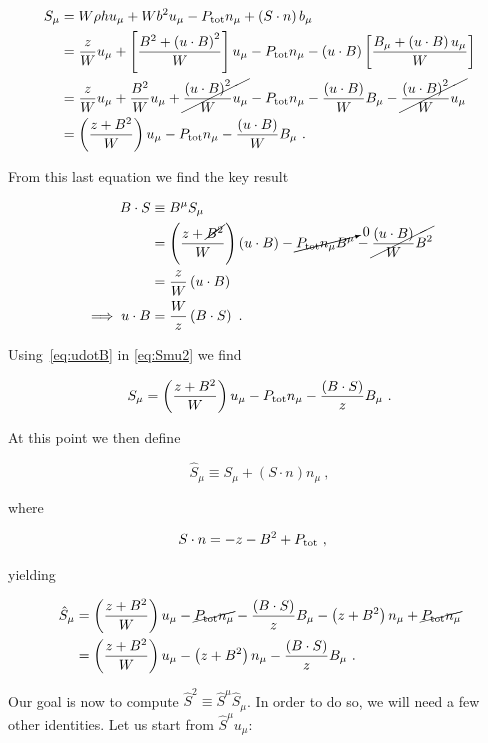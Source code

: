 \documentclass{article}
\newcommand{\BdotS}{B\cdot S}
\newcommand{\Sdotn}{S\cdot n}
\newcommand{\udotB}{u\cdot B}
\newcommand{\Ptot}{P_{\rm tot}}
\newcommand{\eq}[1]{
\begin{equation}
    #1
\end{equation}
}
\newcommand{\spl}[1]{
\eq{
\begin{split}
    #1
\end{split}
}
}
\begin{document}
\spl{
S_{\mu} &= W\rho h u_{\mu} + W b^{2} u_{\mu} - \Ptot n_{\mu} + \left(\Sdotn\right)b_{\mu}\\
&= \frac{z}{W}u_{\mu} + \left[\frac{B^{2}+\left(\udotB\right)^{2}}{W}\right]u_{\mu} - \Ptot n_{\mu} - \left(\udotB\right)\left[\frac{B_{\mu} + \left(\udotB\right)u_{\mu}}{W}\right]\\
&= \frac{z}{W}u_{\mu} + \frac{B^{2}}{W}u_{\mu} + \cancel{\frac{\left(\udotB\right)^{2}}{W}u_{\mu}} - \Ptot n_{\mu} - \frac{\left(\udotB\right)}{W}B_{\mu} -\cancel{\frac{\left(\udotB\right)^{2}}{W}u_{\mu}}\\
& = \left(\frac{z+B^{2}}{W}\right)u_{\mu} - \Ptot n_{\mu} - \frac{\left(\udotB\right)}{W}B_{\mu}\ .\label{eq:Smu2}
}

\noindent From this last equation we find the key result

\spl{
\BdotS &\equiv B^{\mu}S_{\mu}\\
       &= \left(\frac{z + \cancel{B^{2}}}{W}\right)\left(\udotB\right) - \cancelto{0}{\Ptot n_{\mu}B^{\mu}} - \cancel{\frac{\left(\udotB\right)}{W}B^{2}}\\
      &= \frac{z}{W}\left(\udotB\right)\\
\implies \udotB &= \frac{W}{z}\left(\BdotS\right)\ .\label{eq:udotB}
}

\noindent Using~\eqref{eq:udotB} in \eqref{eq:Smu2} we find

\eq{
S_{\mu} = \left(\frac{z+B^{2}}{W}\right)u_{\mu} - \Ptot n_{\mu} - \frac{\left(\BdotS\right)}{z}B_{\mu}\ .\label{eq:Smufinal}
}

\noindent At this point we then define

\eq{
\hat{S}_{\mu} \equiv S_{\mu} + \left(\Sdotn\right)n_{\mu}\ ,
}

\noindent where

\spl{
\Sdotn &= -z-B^{2} + \Ptot\ ,\label{eq:Sdotn}
}

\noindent yielding

\spl{
\hat{S}_{\mu} &= \left(\frac{z+B^{2}}{W}\right)u_{\mu} - \cancel{\Ptot n_{\mu}} - \frac{\left(\BdotS\right)}{z}B_{\mu} - \left(z+B^{2}\right)n_{\mu} + \cancel{\Ptot n_{\mu}}\\
&= \left(\frac{z+B^{2}}{W}\right)u_{\mu} - \left(z+B^{2}\right)n_{\mu} - \frac{\left(\BdotS\right)}{z}B_{\mu}\ .\label{eq:Shatmufinal}
}

Our goal is now to compute $\hat{S}^{2} \equiv \hat{S}^{\mu}\hat{S}_{\mu}$. In order to do so, we will need a few other identities. Let us start from $\hat{S}^{\mu}u_{\mu}$:
\end{document}
